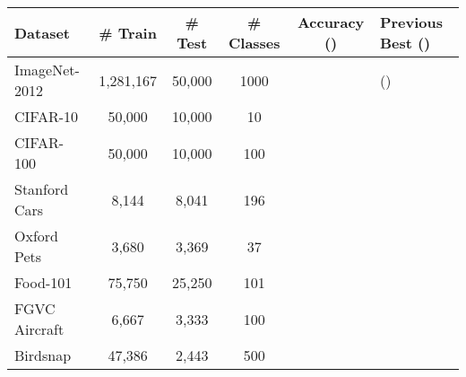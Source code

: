 \documentclass{article}
\def\onedot{.}
\def\etal{\emph{et al}\onedot}
\begin{document}
\begin{table*}[t]
\begin{small}
\begin{center}
\caption{Image classification accuracy using AmoebaNet-B (18, 512) first trained on ImageNet 2012 then fine-tuned on others. Please refer to the supplementary material for a detailed description of our training setup.  Our fine-tuned results were averaged across 5 fine-tuning runs.  Baseline results from  Real \etal~\cite{real2018regularized} and Cubuk \etal~\cite{cubuk2018autoaugment} were directly trained from scratch.  *Mahajan \etal's model~\cite{mahajan2018exploring} achieved  top-1 accuracy but it was pretrained on non-public Instagram data. Ngiam \etal~\cite{ngiam2018domain} achieved better results by pre-training with data from a private dataset (JFT-300M).}
\label{table:cv_results}
\begin{tabular}{lccccl}
\toprule
Dataset & \# Train & \# Test & \# Classes & Accuracy () & Previous Best ()  \\ 
\midrule
 ImageNet-2012 & 1,281,167 & 50,000 & 1000 &  &  \cite{real2018regularized} (\cite{mahajan2018exploring}) \\
 CIFAR-10  & 50,000 & 10,000 & 10  &  &  \cite{cubuk2018autoaugment}  \\ 
 CIFAR-100 &  50,000 & 10,000 & 100       &  &  \cite{cubuk2018autoaugment}  \\ 
 Stanford Cars   & 8,144 & 8,041 & 196   &  &  \cite{cubuk2018autoaugment}  \\
 Oxford Pets &3,680 & 3,369 & 37  &  &  \cite{peng2018object}  \\ 
 Food-101    & 75,750 & 25,250 & 101      &  &  \cite{Cui2018}  \\
 FGVC Aircraft  & 6,667 &3,333 & 100   &  &  \cite{Yu18}  \\
 Birdsnap & 47,386 & 2,443  & 500     &  &  \cite{wei2018mask}  \\
\bottomrule
\end{tabular}
\end{center}
\end{small}
\end{table*}
\end{document}
